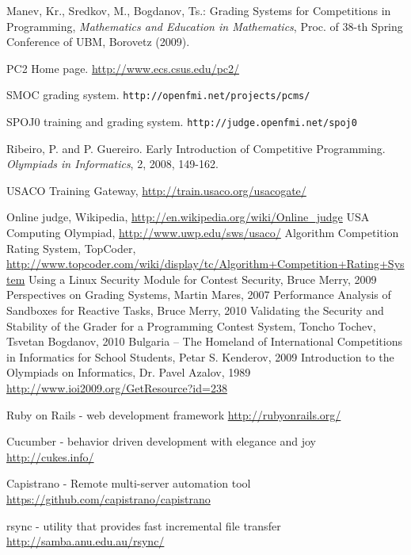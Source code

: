 \documentclass[a4paper,12pt]{article}
\begin{document}
  \begin{thebibliography}{99}

      Manev, Kr.,  Sredkov, M., Bogdanov, Ts.: Grading Systems for Competitions in Programming, \textit{Mathematics and Education in Mathematics}, Proc. of 38-th Spring Conference of UBM, Borovetz (2009). 
    
      PC2 Home page. \url{http://www.ecs.csus.edu/pc2/}

      SMOC grading system. \texttt{http://openfmi.net/projects/pcms/}

      SPOJ0 training and grading system. \texttt{http://judge.openfmi.net/spoj0}

      Ribeiro, P. and P. Guereiro. Early Introduction of Competitive Program\-ming. \textit{Olympiads in Informatics}, 2, 2008, 149-162.

     USACO Training Gateway, \url{http://train.usaco.org/usacogate/}
    
      Online judge, Wikipedia, \url{http://en.wikipedia.org/wiki/Online_judge}
      USA Computing Olympiad, \url{http://www.uwp.edu/sws/usaco/}
      Algorithm Competition Rating System, TopCoder, \url{http://www.topcoder.com/wiki/display/tc/Algorithm+Competition+Rating+System}
      Using a Linux Security Module for Contest Security, Bruce Merry, 2009
      Perspectives on Grading Systems, Martin Mares, 2007
      Performance Analysis of Sandboxes for Reactive Tasks, Bruce Merry, 2010
      Validating the Security and Stability of the Grader for a Programming Contest System, Toncho Tochev, Tsvetan Bogdanov, 2010
      Bulgaria – The Homeland of International Competitions in Informatics for School Students, Petar S. Kenderov, 2009
      Introduction to the Olympiads on Informatics, Dr. Pavel Azalov, 1989 \url{http://www.ioi2009.org/GetResource?id=238}
      
      Ruby on Rails - web development framework \url{http://rubyonrails.org/}
      
      Cucumber - behavior driven development with elegance and joy \url{http://cukes.info/}
    
      Capistrano - Remote multi-server automation tool \url{https://github.com/capistrano/capistrano}
      
      rsync - utility that provides fast incremental file transfer \url{http://samba.anu.edu.au/rsync/}
      
  \end{thebibliography}
\end{document}
